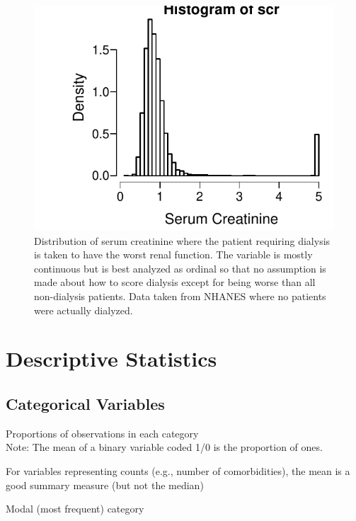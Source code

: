 \begin{Schunk}
\begin{figure}[htbp]

\centerline{\includegraphics[width=\maxwidth]{descript-ordc-1} }

\caption[Continuous distribution with clumping at the end]{Distribution of serum creatinine where the patient requiring dialysis is taken to have the worst renal function.  The variable is mostly continuous but is best analyzed as ordinal so that no assumption is made about how to score dialysis except for being worse than all non-dialysis patients. Data taken from NHANES where no patients were actually dialyzed.}\label{fig:descript-ordc}
\end{figure}
\end{Schunk}
\clearpage
\section{Descriptive Statistics}    
\subsection{Categorical Variables}
\bi
\item Proportions of observations in each category \\
  Note: The mean of a binary variable coded 1/0 is the proportion of
  ones.
\item For variables representing counts (e.g., number of
  comorbidities), the mean is a good summary measure (but not the median)
\item Modal (most frequent) category
\ei

